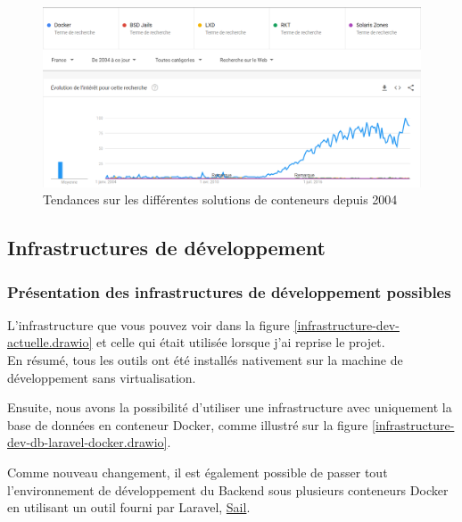 \documentclass[
    iai, %
    il, %
]{heig-tb}
\begin{document}
\begin{center}
    \begin{figure}
        \includegraphics[width=\textwidth]{./assets/figures/google-trend-containers-2022.png}
        \caption[Tendances solutions de conteneurs]{Tendances sur les différentes solutions de conteneurs depuis 2004} \label{containers-trends}
    \end{figure}
\end{center}

\subsection{Infrastructures de développement}

\subsubsection{Présentation des infrastructures de développement possibles}
L'infrastructure que vous pouvez voir dans la figure \ref{infrastructure-dev-actuelle.drawio} et celle qui était utilisée lorsque j'ai reprise le projet.\\
En résumé, tous les outils ont été installés nativement sur la machine de développement sans virtualisation.

Ensuite, nous avons la possibilité d'utiliser une infrastructure avec uniquement la base de données
en conteneur Docker, comme illustré sur la figure \ref{infrastructure-dev-db-laravel-docker.drawio}.

Comme nouveau changement, il est également possible de passer tout l'environnement de développement
du Backend sous plusieurs conteneurs Docker en utilisant un outil fourni par Laravel, \href{https://laravel.com/docs/9.x/sail}{Sail}.
\end{document}
